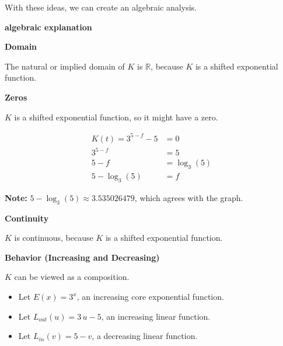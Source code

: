 \documentclass{ximera}
\begin{document}
\begin{example}
\begin{image}
\end{image}


With these ideas, we can create an algebraic analysis. 


\textbf{\textcolor{red!75!green}{algebraic explanation}} 





\textbf{Domain}

The natural or implied domain of $K$ is $\mathbb{R}$, because $K$ is a shifted exponential function. 


\textbf{Zeros}

$K$ is a shifted exponential function, so it might have a zero. 







\begin{align*}
K(t) = 3^{5 - f} - 5 & = 0 \\
3^{5 - f}            & = 5  \\
5 - f                & = \log_3(5)  \\
5 - \log_3(5)        & = f  
\end{align*}





\textbf{Note:}  $5 - \log_3(5) \approx 3.535026479$, which agrees with the graph. 




\textbf{Continuity}

$K$ is continuous, because $K$ is a shifted exponential function. 





\textbf{Behavior (Increasing and Decreasing)}


$K$ can be viewed as a composition.



\begin{itemize}
  \item Let $E(x) = 3^x$, an increasing core exponential function.
  \item Let $L_{out}(u) = 3\,u-5$, an increasing linear function.
  \item Let $L_{in}(v) = 5-v$, a decreasing linear function.
\end{itemize}


\end{example}
\end{document}
